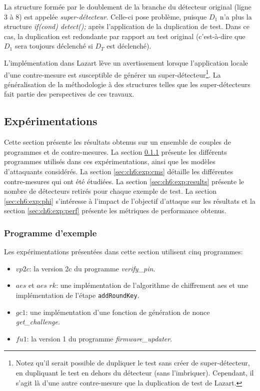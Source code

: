                 La structure formée par le doublement de la branche du détecteur original (ligne 3 à 8) est appelée \textit{super-détecteur}. Celle-ci pose problème, puisque $D_1$ n'a plus la structure \textit{if(cond) { detect(); }} après l'application de la duplication de test.           
                Dans ce cas, la duplication est redondante par rapport au test original (c'est-à-dire que $D_1$ sera toujours déclenché si $D_T$ est déclenché).
                
                L'implémentation dans Lazart lève un avertissement lorsque l'application locale d'une contre-mesure est susceptible de générer un super-détecteur\footnote{Notez qu'il serait possible de dupliquer le test sans créer de super-détecteur, en dupliquant le test en dehors du détecteur (sans l'imbriquer). Cependant, il s'agit là d'une autre contre-mesure que la duplication de test de Lazart.}. 
                La généralisation de la méthodologie à des structures telles que les super-détecteurs fait partie des perspectives de ces travaux.

        \subsection{Expérimentations}
        \label{sec:ch6:exp}
        
            Cette section présente les résultats obtenus sur un ensemble de couples de programmes et de contre-mesures.                      
            La section \ref{sec:ch6:exp:bench} présente les différents programmes utilisés dans ces expérimentations, ainsi que les modèles d'attaquants considérés.
            La section \ref{sec:ch6:exp:cms} détaille les différentes contre-mesures qui ont été étudiées.
            La section \ref{sec:ch6:exp:results} présente le nombre de détecteurs retirés pour chaque exemple de test. La section \ref{sec:ch6:exp:phi} s'intéresse à l'impact de l'objectif d'attaque sur les résultats et la section \ref{sec:ch6:exp:perf} présente les métriques de performance obtenus.
        
            \subsubsection{Programme d'exemple}
            \label{sec:ch6:exp:bench}
        
                Les expérimentations présentées dans cette section utilisent cinq programmes:
                \begin{itemize}
                    \item $vp2c$: la version 2c du programme \textit{verify\_pin}.
                    \item $aes$ et $aes$ $rk$: une implémentation de l'algorithme de chiffrement \gls{aes} et une implémentation de l'étape \texttt{addRoundKey}.
                    \item $gc1$: une implémentation d'une fonction de génération de nonce \textit{get\_challenge}.
                    \item $fu1$: la version 1 du programme \textit{firmware\_updater}.
                \end{itemize}
            
